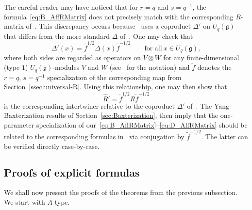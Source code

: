\documentclass[10pt,a4paper]{amsart}
\numberwithin{equation}{section}
\newcommand{\fg}{\mathfrak{g}}
\begin{document}
\begin{Remark}\label{remark6.14}
The careful reader may have noticed that for $r = q$ and $s = q^{-1}$, the formula~\eqref{eq:B_AffRMatrix} does not precisely match with the corresponding $R$-matrix of~\cite{Jim}. This discrepancy occurs because~\cite{Jim} uses a coproduct $\Delta'$ on $U_q(\fg)$ that differs from the more standard $\Delta$ of~\cite{J}. One may check that
\begin{displaymath}
 \Delta'(x) = \tilde{f}^{1/2}\Delta(x)\tilde{f}^{-1/2}\qquad \text{for all}\ x \in U_{q}(\fg),
\end{displaymath}
where both sides are regarded as operators on $V\otimes W$ for any finite-dimensional (type $1$) $U_{q}(\fg)$-modules $V$ and $W$ (see~\cite[Chapter~7]{J} for the notation) and $\tilde{f}$ denotes the $r = q$, $s = q^{-1}$ specialization of the corresponding map from Section~\ref{ssec:universal-R}. Using this relationship, one may then show that
\begin{displaymath}
 \hat{R}' = \tilde{f}^{1/2} \hat{R} \tilde{f}^{-1/2}
\end{displaymath}
is the corresponding intertwiner relative to the coproduct $\Delta'$ of~\cite{Jim}. The Yang--Baxterization results of Section~\ref{sec:Baxterization}, then imply that the one-parameter specialization of our~\eqref{eq:B_AffRMatrix}--\eqref{eq:D_AffRMatrix} should be related to the corresponding formulas in~\cite{Jim} via conjugation by $\tilde{f}^{-1/2}$. The latter can be verified directly case-by-case.
\end{Remark}

\subsection{Proofs of explicit formulas}

We shall now present the proofs of the theorems from the previous subsection. We start with $A$-type.
\end{document}
